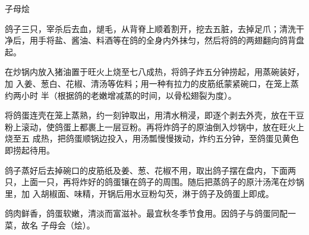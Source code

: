 \begin{recipe}{子母烩}

\ingredients


\preparation

\step 鸽子三只，宰杀后去血，煺毛，从背脊上顺着割开，挖去五脏，去掉足爪；清洗干
净后，用手将盐、酱油、料酒等在鸽的全身内外抹匀，然后将鸽的两翅翻向鸽背盘起。

在炒锅内放入猪油置于旺火上烧至七八成热，将鸽子炸五分钟捞起，用蒸碗装好，加
入姜、葱白、花椒、清汤等佐料；用一种有拉力的皮筋纸蒙紧碗口，在笼上蒸约两小时
半（根据鸽的老嫩增减蒸的时间，以骨松翅裂为度）。

\step 将鸽蛋连壳在笼上蒸熟，约一刻钟取出，用清水稍浸，即逐个剥去外壳，放在干豆
粉上滚动，使鸽蛋上都裹上一层豆粉。再将炸鸽子的原油倒入炒锅中，放在旺火上烧至五
成热，把鸽蛋顺锅边投入，用汤瓢慢慢拨动，炸约五分钟，至鸽蛋见黄色即捞起待用。

\step 鸽子蒸好后去掉碗口的皮筋纸及姜、葱、花椒不用，取出鸽子摆在盘内，下面两
只，上面一只，再将炸好的鸽蛋镶在鸽子的周围。随后把蒸鸽子的原汁汤滗在炒锅里，加
入胡椒面、味精，开锅后用水豆粉勾芡，淋于鸽子及鸽蛋上即成。

\features

鸽肉鲜香，鸽蛋软嫩，清淡而富滋补。最宜秋冬季节食用。因鸽子与鸽蛋同配一菜，故名
子母会（烩）。

\end{recipe}

